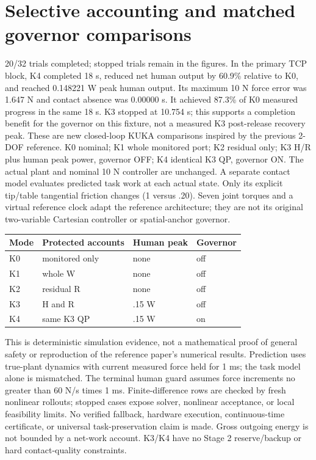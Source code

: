 \documentclass[10pt,letterpaper]{article}
\begin{document}
\section*{Selective accounting and matched governor comparisons}
20/32 trials completed; stopped trials remain in the figures. In the primary TCP block, K4 completed 18 s, reduced net human output by 60.9\% relative to K0, and reached 0.148221 W peak human output. Its maximum 10 N force error was 1.647 N and contact absence was 0.00000 s. It achieved 87.3\% of K0 measured progress in the same 18 s. K3 stopped at 10.754 s; this supports a completion benefit for the governor on this fixture, not a measured K3 post-release recovery peak.
These are new closed-loop KUKA comparisons inspired by the previous 2-DOF reference. K0 nominal; K1 whole monitored port; K2 residual only; K3 H/R plus human peak power, governor OFF; K4 identical K3 QP, governor ON. The actual plant and nominal 10 N controller are unchanged. A separate contact model evaluates predicted task work at each actual state. Only its explicit tip/table tangential friction changes (1 versus .20). Seven joint torques and a virtual reference clock adapt the reference architecture; they are not its original two-variable Cartesian controller or spatial-anchor governor.
\begin{center}\begin{tabular}{llll}\toprule Mode & Protected accounts & Human peak & Governor\\\midrule K0 & monitored only & none & off\\ K1 & whole W & none & off\\ K2 & residual R & none & off\\ K3 & H and R & .15 W & off\\ K4 & same K3 QP & .15 W & on\\\bottomrule\end{tabular}\end{center}
This is deterministic simulation evidence, not a mathematical proof of general safety or reproduction of the reference paper's numerical results. Prediction uses true-plant dynamics with current measured force held for 1 ms; the task model alone is mismatched. The terminal human guard assumes force increments no greater than 60 N/s times 1 ms. Finite-difference rows are checked by fresh nonlinear rollouts; stopped cases expose solver, nonlinear acceptance, or local feasibility limits. No verified fallback, hardware execution, continuous-time certificate, or universal task-preservation claim is made. Gross outgoing energy is not bounded by a net-work account. K3/K4 have no Stage 2 reserve/backup or hard contact-quality constraints.
\end{document}

